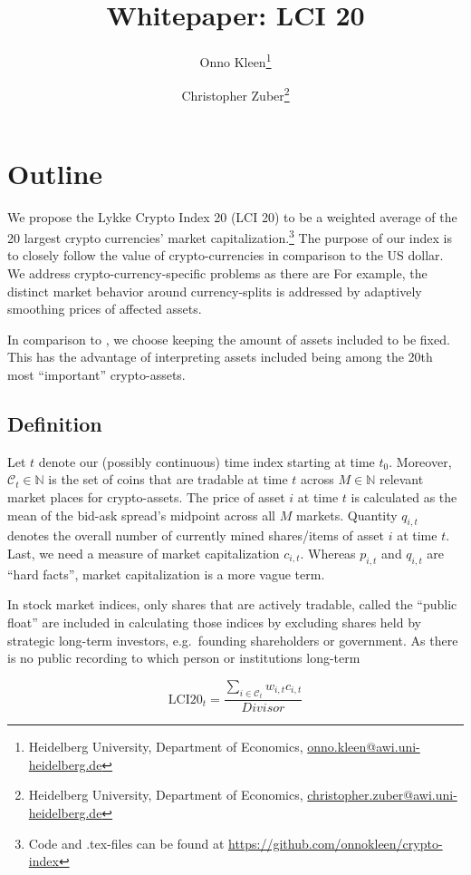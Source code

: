 \documentclass[11pt]{article}
\title{Whitepaper: LCI 20}
\author{
Onno Kleen\thanks{Heidelberg University, Department of Economics, \href{mailto:onno.kleen@awi.uni-heidelberg.de}{onno.kleen@awi.uni-heidelberg.de}} 
\and 
Christopher Zuber\thanks{Heidelberg University, Department of Economics, \href{mailto:christopher.zuber@awi.uni-heidelberg.de}{christopher.zuber@awi.uni-heidelberg.de}}
}
\begin{document}
\maketitle
\section{Outline}

We propose the Lykke Crypto Index 20 (LCI 20) to be a weighted average of the 20 largest crypto currencies' market capitalization.\footnote{Code and .tex-files can be found at \href{https://github.com/onnokleen/crypto-index}{https://github.com/onnokleen/crypto-index}}
The purpose of our index is to closely follow the value of crypto-currencies in comparison to the US dollar.
We address crypto-currency-specific problems as there are 
For example, the distinct market behavior around currency-splits is addressed by adaptively smoothing prices of affected assets.

In comparison to \cite{Trimborn2016}, we choose keeping the amount of assets included to be fixed.
This has the advantage of interpreting assets included being among the 20th most ``important'' crypto-assets.

\subsection{Definition}

Let $t$ denote our (possibly continuous) time index starting at time $t_0$. 
Moreover, $\mathcal{C}_t \in \mathbb{N}$ is the set of coins that are tradable at time $t$ across $M \in \mathbb{N}$ relevant market places for crypto-assets.
The price of asset $i$ at time $t$ is calculated as the mean of the bid-ask spread's midpoint across all $M$ markets.
Quantity $q_{i,t}$ denotes the overall number of currently mined shares/items of asset $i$ at time $t$.
Last, we need a measure of market capitalization $c_{i,t}$.
Whereas $p_{i,t}$ and $q_{i,t}$ are ``hard facts'', market capitalization is a more vague term.

In stock market indices, only shares that are actively tradable, called the ``public float'' are included in calculating those indices by excluding shares held by strategic long-term investors, e.g.\ founding shareholders or government.
As there is no public recording to which person or institutions long-term 

$$ \text{LCI20}_t = \frac{\sum_{i \in \mathcal{C}_{t}} w_{i,t} c_{i,t}}{Divisor} $$
\end{document}
